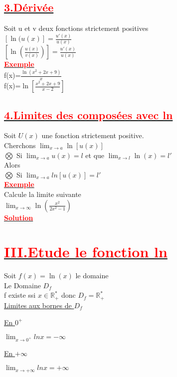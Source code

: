 \documentclass[12pt]{article}
\begin{document}
\subsection*{\underline{\textbf{\textcolor{red}{3.Dérivée}}}}
Soit u et v deux fonctions strictement positives \\
$[\ln(u(x)]=\frac{u'(x)}{u(x)}$\\
$[\ln(\frac{u(x)}{v(x)})]=\frac{u'(x)}{u(x)}$\\
\underline{\textbf{\textcolor{red}{Exemple}}}\\
f(x)=$\frac{\ln(x^{2}+2x+9)}{x}$\\
f(x)=$\ln[\frac{x^{2}+2x+9}{x-2}]$
\subsection*{\underline{\textbf{\textcolor{red}{4.Limites des composées avec ln}}}}
Soit $U(x)$ une fonction strictement positive.\\
Cherchons $\lim_{{x \to a}} \ln[u(x)]$\\
$\bigotimes$ Si $\lim_{{x \to a}} u(x)=l$ et que $\lim_{{x \to l}} \ln(x)=l'$\\
Alors \\
$\bigotimes$ Si $\lim_{{x \to a}} ln[u(x)]=l'$\\
\underline{\textbf{\textcolor{red}{Exemple}}}\\
Calcule la limite suivante\\
$\lim_{{x \to \infty}} \ln(\frac{x^{2}}{2x^{2}-1})$\\
\underline{\textbf{\textcolor{red}{Solution}}}\\

\section*{\underline{\textbf{\textcolor{red}{III.Etude le fonction ln}}}}
Soit $f(x)=\ln(x)$ le domaine \\
Le Domaine $D_{f}$ \\
f existe ssi $x\in \mathbb{R^{*}_{+}}$ donc $D_{f}=\mathbb{R^{*}_{+}}$\\

\underline{Limites aux bornes de $D_{f}$}

\underline{En $0^{+}$}

$\lim_{{x \to 0^{+}}} lnx=-\infty$

\underline{En $+\infty$}

$\lim_{{x \to +\infty}} lnx=+\infty$
\end{document}
